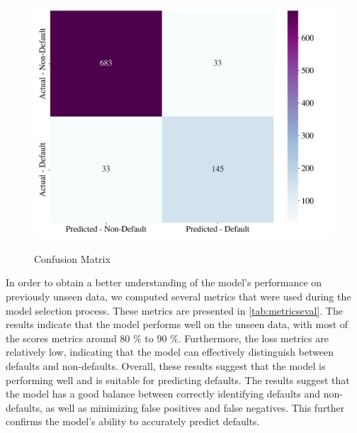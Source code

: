 \begin{figure}[H]
\centering
\caption{Confusion Matrix}\vspace{0.5em}
\label{fig:confmat}\
\includegraphics[width=130mm]{Figures/Confusion_Matrix.jpg}
\vspace{-1em}
\end{figure}

In order to obtain a better understanding of the model's performance on previously unseen data, we computed several metrics that were used during the model selection process.
These metrics are presented in \autoref{tab:metricseval}. The results indicate that the model performs well on the unseen data, with most of the scores metrics around 80 \% to 90 \%.
Furthermore, the loss metrics are relatively low, indicating that the model can effectively distinguish between defaults and non-defaults.
Overall, these results suggest that the model is performing well and is suitable for predicting defaults.
The results suggest that the model has a good balance between correctly identifying defaults and non-defaults, as well as minimizing false positives and false negatives. This further confirms the model's ability to accurately predict defaults.

